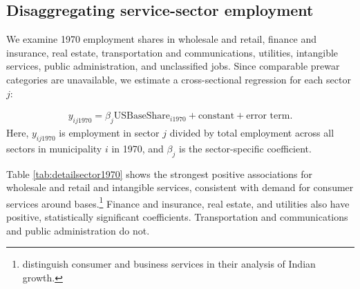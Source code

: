 \documentclass[12pt, unicode, a4paper]{article}
\newcommand{\1}{\mbox{1}\hspace{-0.25em}\mbox{l}} %
\begin{document}
\clearpage

\subsection{Disaggregating service-sector employment}

We examine 1970 employment shares in wholesale and retail, finance and insurance, real estate, transportation and communications, utilities, intangible services, public administration, and unclassified jobs. Since comparable prewar categories are unavailable, we estimate a cross-sectional regression for each sector $j$:

\begin{align}\label{eq:regeq_diff_detailsector}
  y_{ij1970} =  \beta_j \text{USBaseShare}_{i1970} + \text{constant} + \text{error term}.
\end{align}
Here, $y_{ij1970}$ is employment in sector $j$ divided by total employment across all sectors in municipality $i$ in 1970, and $\beta_j$ is the sector-specific coefficient.

Table \ref{tab:detailsector1970} shows the strongest positive associations for wholesale and retail and intangible services, consistent with demand for consumer services around bases.\footnote{ distinguish consumer and business services in their analysis of Indian growth.} Finance and insurance, real estate, and utilities also have positive, statistically significant coefficients. Transportation and communications and public administration do not.
\end{document}

